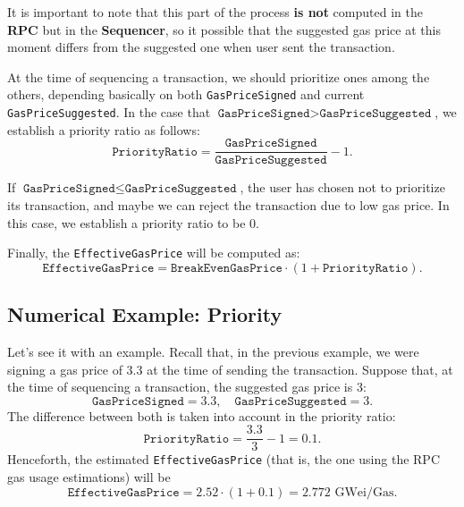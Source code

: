It is important to note that this part of the process \textbf{is not} computed in the \textbf{RPC} but in the \textbf{Sequencer}, so it possible that the suggested gas price at this moment differs from the suggested one when user sent the transaction.

At the time of sequencing a transaction, we should prioritize ones among the others, depending basically on both \texttt{GasPriceSigned} and current \texttt{GasPriceSuggested}. In the case that $\texttt{GasPriceSigned} > \texttt{GasPriceSuggested}$, we establish a priority ratio as follows:
\[
\texttt{PriorityRatio} = \frac{\texttt{GasPriceSigned}}{\texttt{GasPriceSuggested}} - 1.
\]

If $\texttt{GasPriceSigned} \leq \texttt{GasPriceSuggested}$, the user has chosen not to prioritize its transaction, and maybe we can reject the transaction due to low gas price. In this case, we establish a priority ratio to be $0$.

Finally, the \texttt{EffectiveGasPrice} will be computed as:
\[
\texttt{EffectiveGasPrice} = \texttt{BreakEvenGasPrice} \cdot (1 + \texttt{PriorityRatio}).
\]


\subsection{Numerical Example: Priority}

 Let's see it with an example. Recall that, in the previous example, we were signing a gas price of $3.3$ at the time of sending the transaction. Suppose that, at the time of sequencing a transaction, the suggested gas price is 3:
\[
\texttt{GasPriceSigned} = 3.3, \quad \texttt{GasPriceSuggested} = 3.
\]
The difference between both is taken into account in the priority ratio:
\[
\texttt{PriorityRatio} = \frac{3.3}{3} - 1 = 0.1.
\]
Henceforth, the estimated \texttt{EffectiveGasPrice} (that is, the one using the RPC gas usage estimations) will be
\[
\texttt{EffectiveGasPrice} = 2.52 \cdot (1 + 0.1) = 2.772 \text{ GWei/Gas}.
\]
